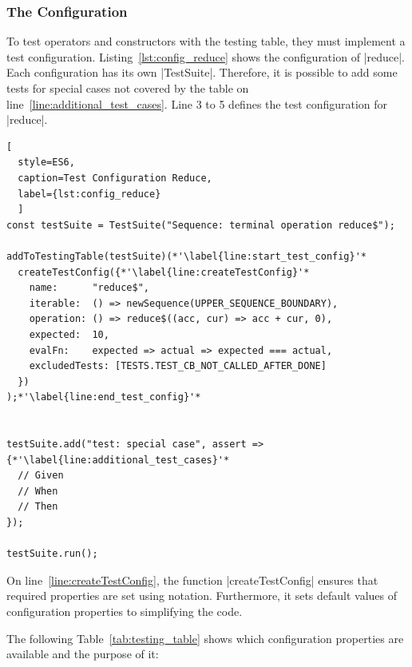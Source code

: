 \subsubsection{The Configuration}
\label{subsub:The Configuration}

To test operators and constructors with the testing table, they must implement 
a test configuration.
Listing~\ref{lst:config_reduce} shows the configuration of |reduce|. 
Each configuration has its own |TestSuite|. Therefore, it is possible to add
some tests for special cases not covered by the table on line~\ref{line:additional_test_cases}.
Line 3 to 5 defines the test configuration for |reduce|. 

\begin{lstlisting}[
  style=ES6, 
  caption=Test Configuration Reduce,
  label={lst:config_reduce}
  ]
const testSuite = TestSuite("Sequence: terminal operation reduce$");

addToTestingTable(testSuite)(*'\label{line:start_test_config}'*
  createTestConfig({*'\label{line:createTestConfig}'*
    name:      "reduce$",
    iterable:  () => newSequence(UPPER_SEQUENCE_BOUNDARY),
    operation: () => reduce$((acc, cur) => acc + cur, 0),
    expected:  10,
    evalFn:    expected => actual => expected === actual,
    excludedTests: [TESTS.TEST_CB_NOT_CALLED_AFTER_DONE]
  })
);*'\label{line:end_test_config}'*


testSuite.add("test: special case", assert =>
{*'\label{line:additional_test_cases}'*
  // Given
  // When
  // Then
});

testSuite.run();
\end{lstlisting}

On line~\ref{line:createTestConfig}, the function |createTestConfig| ensures
that required properties are set using notation. Furthermore, it sets default
values of configuration properties to simplifying the code.

The following Table~\ref{tab:testing_table} shows which configuration 
properties are available and the purpose of it:


